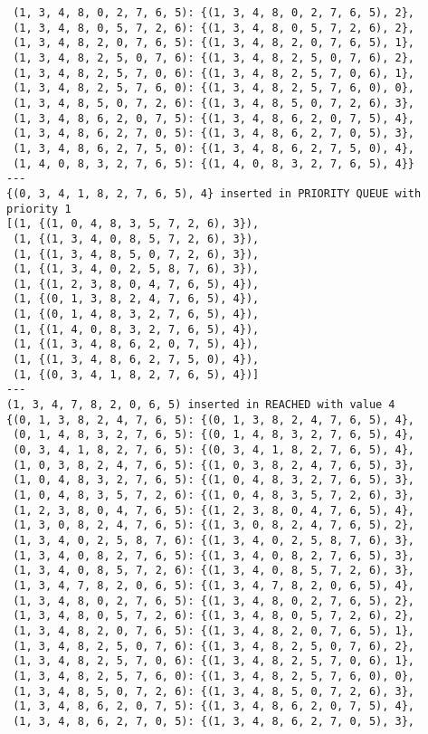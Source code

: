 \documentclass{article}
\begin{document}
\begin{verbatim}
 (1, 3, 4, 8, 0, 2, 7, 6, 5): {(1, 3, 4, 8, 0, 2, 7, 6, 5), 2},
 (1, 3, 4, 8, 0, 5, 7, 2, 6): {(1, 3, 4, 8, 0, 5, 7, 2, 6), 2},
 (1, 3, 4, 8, 2, 0, 7, 6, 5): {(1, 3, 4, 8, 2, 0, 7, 6, 5), 1},
 (1, 3, 4, 8, 2, 5, 0, 7, 6): {(1, 3, 4, 8, 2, 5, 0, 7, 6), 2},
 (1, 3, 4, 8, 2, 5, 7, 0, 6): {(1, 3, 4, 8, 2, 5, 7, 0, 6), 1},
 (1, 3, 4, 8, 2, 5, 7, 6, 0): {(1, 3, 4, 8, 2, 5, 7, 6, 0), 0},
 (1, 3, 4, 8, 5, 0, 7, 2, 6): {(1, 3, 4, 8, 5, 0, 7, 2, 6), 3},
 (1, 3, 4, 8, 6, 2, 0, 7, 5): {(1, 3, 4, 8, 6, 2, 0, 7, 5), 4},
 (1, 3, 4, 8, 6, 2, 7, 0, 5): {(1, 3, 4, 8, 6, 2, 7, 0, 5), 3},
 (1, 3, 4, 8, 6, 2, 7, 5, 0): {(1, 3, 4, 8, 6, 2, 7, 5, 0), 4},
 (1, 4, 0, 8, 3, 2, 7, 6, 5): {(1, 4, 0, 8, 3, 2, 7, 6, 5), 4}}
---
{(0, 3, 4, 1, 8, 2, 7, 6, 5), 4} inserted in PRIORITY QUEUE with priority 1
[(1, {(1, 0, 4, 8, 3, 5, 7, 2, 6), 3}),
 (1, {(1, 3, 4, 0, 8, 5, 7, 2, 6), 3}),
 (1, {(1, 3, 4, 8, 5, 0, 7, 2, 6), 3}),
 (1, {(1, 3, 4, 0, 2, 5, 8, 7, 6), 3}),
 (1, {(1, 2, 3, 8, 0, 4, 7, 6, 5), 4}),
 (1, {(0, 1, 3, 8, 2, 4, 7, 6, 5), 4}),
 (1, {(0, 1, 4, 8, 3, 2, 7, 6, 5), 4}),
 (1, {(1, 4, 0, 8, 3, 2, 7, 6, 5), 4}),
 (1, {(1, 3, 4, 8, 6, 2, 0, 7, 5), 4}),
 (1, {(1, 3, 4, 8, 6, 2, 7, 5, 0), 4}),
 (1, {(0, 3, 4, 1, 8, 2, 7, 6, 5), 4})]
---
(1, 3, 4, 7, 8, 2, 0, 6, 5) inserted in REACHED with value 4
{(0, 1, 3, 8, 2, 4, 7, 6, 5): {(0, 1, 3, 8, 2, 4, 7, 6, 5), 4},
 (0, 1, 4, 8, 3, 2, 7, 6, 5): {(0, 1, 4, 8, 3, 2, 7, 6, 5), 4},
 (0, 3, 4, 1, 8, 2, 7, 6, 5): {(0, 3, 4, 1, 8, 2, 7, 6, 5), 4},
 (1, 0, 3, 8, 2, 4, 7, 6, 5): {(1, 0, 3, 8, 2, 4, 7, 6, 5), 3},
 (1, 0, 4, 8, 3, 2, 7, 6, 5): {(1, 0, 4, 8, 3, 2, 7, 6, 5), 3},
 (1, 0, 4, 8, 3, 5, 7, 2, 6): {(1, 0, 4, 8, 3, 5, 7, 2, 6), 3},
 (1, 2, 3, 8, 0, 4, 7, 6, 5): {(1, 2, 3, 8, 0, 4, 7, 6, 5), 4},
 (1, 3, 0, 8, 2, 4, 7, 6, 5): {(1, 3, 0, 8, 2, 4, 7, 6, 5), 2},
 (1, 3, 4, 0, 2, 5, 8, 7, 6): {(1, 3, 4, 0, 2, 5, 8, 7, 6), 3},
 (1, 3, 4, 0, 8, 2, 7, 6, 5): {(1, 3, 4, 0, 8, 2, 7, 6, 5), 3},
 (1, 3, 4, 0, 8, 5, 7, 2, 6): {(1, 3, 4, 0, 8, 5, 7, 2, 6), 3},
 (1, 3, 4, 7, 8, 2, 0, 6, 5): {(1, 3, 4, 7, 8, 2, 0, 6, 5), 4},
 (1, 3, 4, 8, 0, 2, 7, 6, 5): {(1, 3, 4, 8, 0, 2, 7, 6, 5), 2},
 (1, 3, 4, 8, 0, 5, 7, 2, 6): {(1, 3, 4, 8, 0, 5, 7, 2, 6), 2},
 (1, 3, 4, 8, 2, 0, 7, 6, 5): {(1, 3, 4, 8, 2, 0, 7, 6, 5), 1},
 (1, 3, 4, 8, 2, 5, 0, 7, 6): {(1, 3, 4, 8, 2, 5, 0, 7, 6), 2},
 (1, 3, 4, 8, 2, 5, 7, 0, 6): {(1, 3, 4, 8, 2, 5, 7, 0, 6), 1},
 (1, 3, 4, 8, 2, 5, 7, 6, 0): {(1, 3, 4, 8, 2, 5, 7, 6, 0), 0},
 (1, 3, 4, 8, 5, 0, 7, 2, 6): {(1, 3, 4, 8, 5, 0, 7, 2, 6), 3},
 (1, 3, 4, 8, 6, 2, 0, 7, 5): {(1, 3, 4, 8, 6, 2, 0, 7, 5), 4},
 (1, 3, 4, 8, 6, 2, 7, 0, 5): {(1, 3, 4, 8, 6, 2, 7, 0, 5), 3},

\end{verbatim}
\end{document}
